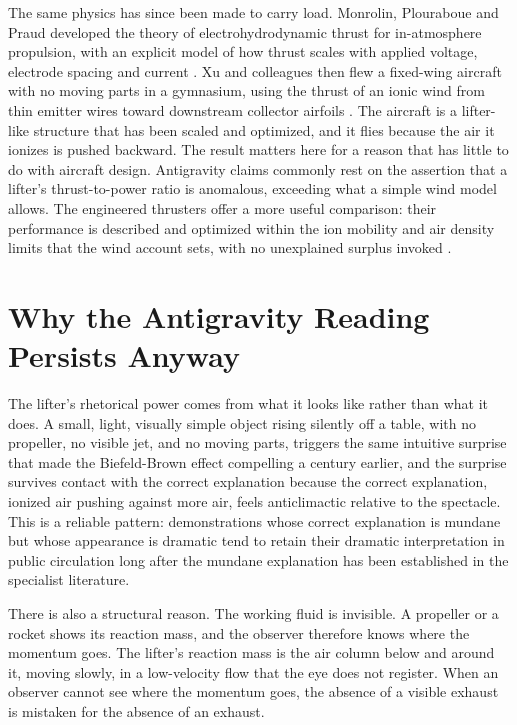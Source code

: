 \documentclass[11pt]{article}
\begin{document}
The same physics has since been made to carry load. Monrolin, Plouraboue and Praud developed the theory of electrohydrodynamic thrust for in-atmosphere propulsion, with an explicit model of how thrust scales with applied voltage, electrode spacing and current \cite{MPP2017}. Xu and colleagues then flew a fixed-wing aircraft with no moving parts in a gymnasium, using the thrust of an ionic wind from thin emitter wires toward downstream collector airfoils \cite{Xu2018}. The aircraft is a lifter-like structure that has been scaled and optimized, and it flies because the air it ionizes is pushed backward. The result matters here for a reason that has little to do with aircraft design. Antigravity claims commonly rest on the assertion that a lifter's thrust-to-power ratio is anomalous, exceeding what a simple wind model allows. The engineered thrusters offer a more useful comparison: their performance is described and optimized within the ion mobility and air density limits that the wind account sets, with no unexplained surplus invoked \cite{MPP2017,Xu2018}.

\section{Why the Antigravity Reading Persists Anyway}

The lifter's rhetorical power comes from what it looks like rather than what it does. A small, light, visually simple object rising silently off a table, with no propeller, no visible jet, and no moving parts, triggers the same intuitive surprise that made the Biefeld-Brown effect compelling a century earlier, and the surprise survives contact with the correct explanation because the correct explanation, ionized air pushing against more air, feels anticlimactic relative to the spectacle. This is a reliable pattern: demonstrations whose correct explanation is mundane but whose appearance is dramatic tend to retain their dramatic interpretation in public circulation long after the mundane explanation has been established in the specialist literature.

There is also a structural reason. The working fluid is invisible. A propeller or a rocket shows its reaction mass, and the observer therefore knows where the momentum goes. The lifter's reaction mass is the air column below and around it, moving slowly, in a low-velocity flow that the eye does not register. When an observer cannot see where the momentum goes, the absence of a visible exhaust is mistaken for the absence of an exhaust.
\end{document}
